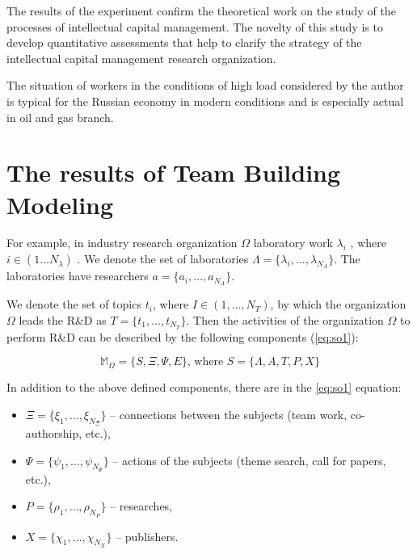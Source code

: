 \documentclass[12pt]{report}
\theoremstyle{definition}
\begin{document}
The results of the experiment confirm the theoretical work on the study of the processes of intellectual capital management. 
The novelty of this study is to develop quantitative assessments that help to clarify the strategy of the intellectual capital management research organization. 

The situation of workers in the conditions of high load considered by the author is typical for the Russian economy in modern conditions and is especially actual in oil and gas branch.

\section {The results of Team Building Modeling}
\label{sec:so}
For example, in industry research organization $\Omega$ laboratory work $\lambda_i$ , where $i \in (1 \dots N_{\lambda})$ . 
We denote the set of laboratories $ \Lambda = \{ \lambda_i, \dots, \lambda_{N_{\Lambda}} \}$.
The laboratories have researchers $ a = \{ a_{i}, \dots, a_{N_A} \} $.  
	
We denote the set of topics $t_i$, where $I \in (1, \dots, N_T )$, by which the organization $\Omega$ leads the R\&D as $T = \{ t_1, \dots , t_{N_T} \}$. Then the activities of the organization $\Omega$ to perform R\&D can be described by the following components (\ref{eq:so1}):

\begin{equation} 
\label{eq:so1}
\mathbb{M}_{\Omega} = \bigg \{ S, \Xi, \Psi, E \bigg \} \mbox {, where }  S = \{ \Lambda, A, T, P, X \}
\end{equation} 

In addition to the above defined components, there are in the \ref{eq:so1} equation:

\begin{itemize}
	\item $ \Xi = \{ \xi_1 , \dots , \xi_{N_{\Xi}} \} $ -- connections between the subjects (team work, co-authorship, etc.),
	\item $ \Psi = \{ \psi_1 , \dots , \psi_{N_{\Psi}} \} $ -- actions of the subjects  (theme search, call for papers, etc.),
	\item $ P = \{ \rho_1 , \dots , \rho_{N_P} \} $ -- researches,
	\item $ X = \{ \chi_1 , \dots , \chi_{N_X}  \} $ -- publishers.
\end{itemize}
\end{document}
